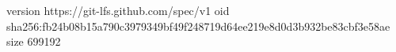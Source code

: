 version https://git-lfs.github.com/spec/v1
oid sha256:fb24b08b15a790c3979349bf49f248719d64ee219e8d0d3b932be83cbf3e58ae
size 699192
